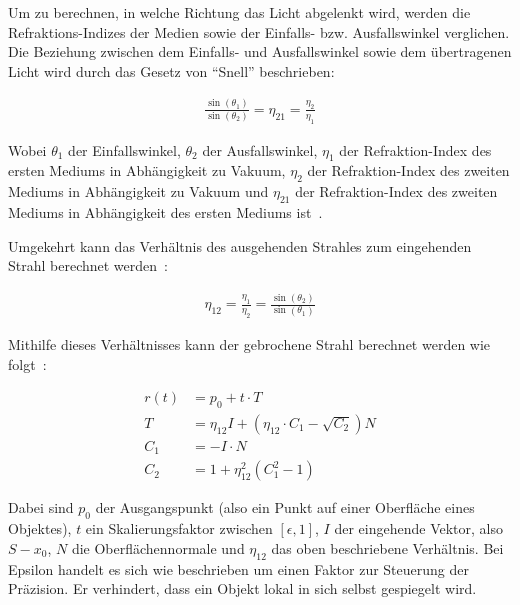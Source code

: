 Um zu berechnen, in welche Richtung das Licht abgelenkt wird, werden die
Refraktions-Indizes der Medien sowie der Einfalls- bzw. Ausfallswinkel
verglichen. Die Beziehung zwischen dem Einfalls- und Ausfallswinkel sowie dem
übertragenen Licht wird durch das Gesetz von ``Snell'' beschrieben:

\begin{gather}
    \frac{\sin(\theta_{1})}{\sin(\theta_{2})} = \eta_{21} = \frac{\eta_{2}}{\eta_{1}}
\end{gather}

Wobei $\theta_{1}$ der Einfallswinkel, $\theta_{2}$
der Ausfallswinkel, $\eta_{1}$ der Refraktion-Index des ersten Mediums
in Abhängigkeit zu Vakuum, $\eta_{2}$ der Refraktion-Index des zweiten
Mediums in Abhängigkeit zu Vakuum und $\eta_{21}$ der Refraktion-Index
des zweiten Mediums in Abhängigkeit des ersten Mediums
ist~\parencite[S. 134 bis 135]{glassner_introduction_1989}.

Umgekehrt kann das Verhältnis des ausgehenden Strahles zum eingehenden
Strahl berechnet werden~\parencite[S. 137 bis
140]{glassner_introduction_1989}:

\begin{gather}
    \eta_{12} = \frac{\eta_{1}}{\eta_{2}} = \frac{\sin(\theta_{2})}{\sin(\theta_{1})}
\end{gather}

Mithilfe dieses Verhältnisses kann der gebrochene Strahl berechnet
werden wie folgt~\parencite[S. 137 bis 140]{glassner_introduction_1989}:

\begin{align}
    r(t) &= p_{0} + t \cdot T \\
    T &= \eta_{12}I + (\eta_{12} \cdot C_{1} - \sqrt{C_{2}})N
    \label{eq:ray_tracing:transm} \\
    C_{1} &= -I \cdot N \\
    C_{2} &= 1 + \eta_{12}^{2}(C_{1}^{2} - 1) \label{eq:ray_tracing:transm_c2}
\end{align}

Dabei sind $p_{0}$ der Ausgangspunkt (also ein Punkt auf einer Oberfläche
eines Objektes), $t$ ein Skalierungsfaktor zwischen $[\epsilon, 1]$, $I$
der eingehende Vektor, also $S - x_{0}$, $N$ die Oberflächennormale und
$\eta_{12}$ das oben beschriebene Verhältnis.
Bei Epsilon handelt es sich wie beschrieben um einen Faktor zur Steuerung
der Präzision. Er verhindert, dass ein Objekt lokal in sich selbst
gespiegelt wird.

